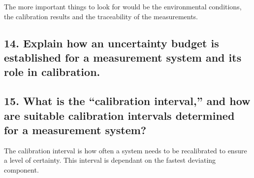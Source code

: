 The more important things to look for would be the environmental conditions, the calibration results and the traceability of the measurements.


\subsection{\textbf{14. Explain how an uncertainty budget is established for a measurement system and its role in calibration.}}



\subsection{\textbf{15. What is the “calibration interval,” and how are suitable calibration intervals determined for a measurement system?}}
The calibration interval is how often a system needs to be recalibrated to ensure a level of certainty. This interval is dependant on the fastest deviating component. 

